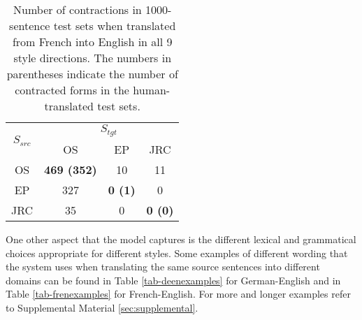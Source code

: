 \documentclass[11pt,a4paper]{article}
\begin{document}
\begin{table}[]
\centering
\begin{tabular}{|c|c|c|c|}
\hline
\multirow{2}{*}{$S_{src}$} & \multicolumn{3}{c|}{$S_{tgt}$}\\
\cline{2-4} 
                      & OS                 & EP             & JRC            \\ \hline
OS                    & \textbf{469 (352)} & 10             & 11             \\ \hline
EP                    & 327                & \textbf{0 (1)} & 0              \\ \hline
JRC                   & 35                 & 0              & \textbf{0 (0)} \\ \hline
\end{tabular}
\caption{\small Number of contractions in 1000-sentence test sets when translated from French into English in all 9 style directions. The numbers in parentheses indicate the number of contracted forms in the human-translated test sets.
      }
      \label{tab-frencontr}
\end{table}

One other aspect that the model captures is the different lexical and grammatical choices appropriate for different styles. Some examples of different wording that the system uses when translating the same source sentences into different domains can be found in Table \ref{tab-deenexamples} for German-English and in Table \ref{tab-frenexamples} for French-English. For more and longer examples refer to Supplemental Material \ref{sec:supplemental}.
\end{document}
